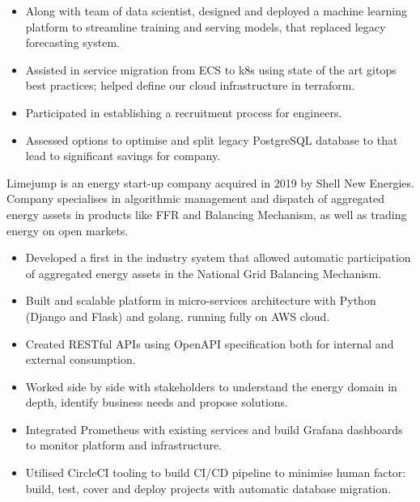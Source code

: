 \documentclass[12pt,english]{resume}
\begin{document}
		\begin{itemize}
			\item Along with team of data scientist, designed and deployed a machine learning platform to streamline training and serving models, that replaced legacy forecasting system.
			\item Assisted in service migration from ECS to k8s using state of the art gitops best practices; helped define our cloud infrastructure in terraform.
			\item Participated in establishing a recruitment process for engineers.
			\item Assessed options to optimise and split legacy PostgreSQL database to that lead to significant savings for company.
		\end{itemize}

		Limejump is an energy start-up company acquired in 2019 by Shell New Energies. Company specialises in algorithmic management and dispatch of aggregated energy assets in products like FFR and Balancing Mechanism, as well as trading energy on open markets.
		
		\begin{itemize}
			\item Developed a first in the industry system that allowed automatic participation of aggregated energy assets in the National Grid Balancing Mechanism.
			\item Built and scalable platform in micro-services architecture with Python (Django and Flask) and golang, running fully on AWS cloud.
			\item Created RESTful APIs using OpenAPI specification both for internal and external consumption.
			\item Worked side by side with stakeholders to understand the energy domain in depth, identify business needs and propose solutions.
			\item Integrated Prometheus with existing services and build Grafana dashboards to monitor  platform and infrastructure.
			\item Utilised CircleCI tooling to build CI/CD pipeline to minimise human factor: build, test, cover and deploy projects with automatic database migration.
		\end{itemize}
				
\end{document}

